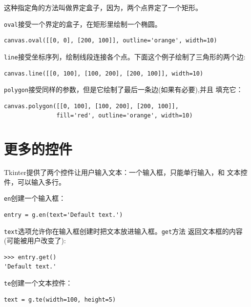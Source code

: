 这种指定角的方法叫做界定盒子，因为，两个点界定了一个矩形。


{\tt oval}接受一个界定的盒子，在矩形里绘制一个椭圆。

\beforeverb
\begin{verbatim}
canvas.oval([[0, 0], [200, 100]], outline='orange', width=10)
\end{verbatim}
\afterverb

{\tt line}接受坐标序列，绘制线段连接各个点。下面这个例子绘制了三角形的两个边:

\beforeverb
\begin{verbatim}
canvas.line([[0, 100], [100, 200], [200, 100]], width=10)
\end{verbatim}
\afterverb

{\tt polygon}接受同样的参数，但是它绘制了最后一条边(如果有必要),并且
填充它：

\beforeverb
\begin{verbatim}
canvas.polygon([[0, 100], [100, 200], [200, 100]],
               fill='red', outline='orange', width=10)
\end{verbatim}
\afterverb

\section{更多的控件}


Tkinter提供了两个控件让用户输入文本：一个输入框，只能单行输入，和
文本控件，可以输入多行。


{\tt en}创建一个输入框：

\beforeverb
\begin{verbatim}
entry = g.en(text='Default text.')
\end{verbatim}
\afterverb

{\tt text}选项允许你在输入框创建时把文本放进输入框。{\tt get}方法
返回文本框的内容(可能被用户改变了):

\beforeverb
\begin{verbatim}
>>> entry.get()
'Default text.'
\end{verbatim}
\afterverb

{\tt te}创建一个文本控件：

\beforeverb
\begin{verbatim}
text = g.te(width=100, height=5)
\end{verbatim}
\afterverb
%

